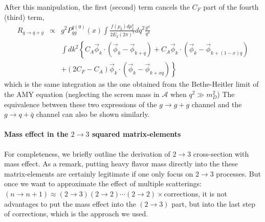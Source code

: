 After this manipulation, the first (second) term cancels the $C_F$ part of the fourth (third) term, 
\begin{eqnarray}
R_{q\rightarrow q+g} &\propto& g^2 P_{qg}^{q(0)}(x) \int  \frac{f(p_2)dp_2^3}{2E_2(2\pi)^3} d q^2 \frac{g^4}{q^4}\\\nonumber
&&  \int d k^2\left\{
C_A\vec{\phi}_{k}\cdot \left( \vec{\phi}_{k}-\vec{\phi}_{k+q} \right)
+C_A\vec{\phi}_{k} \cdot \left( \vec{\phi}_k - \vec{\phi}_{k+(1-x)q}\right) \right.\\\nonumber
&&\left.+(2C_F-C_A)\vec{\phi}_{k} \cdot \left(\vec{\phi}_k-\vec{\phi}_{k+xq} \right)
\right\}
\end{eqnarray}
which is the same integration as the one obtained from the Bethe-Heitler limit of the AMY equation (neglecting the screen mass in $\mathcal{A}$ when $q^2 \gg m_D^2$)
The equivalence between these two expressions of the $g\rightarrow g+g$ channel and the $g\rightarrow q+\bar{q}$ channel can also be shown similarly.

\paragraph*{Mass effect in the $2\rightarrow 3$ squared matrix-elements}
For completeness, we briefly outline the derivation of $2\rightarrow 3$ cross-section with mass effect.
As a remark, putting heavy flavor mass directly into the these matrix-elements are certainly legitimate if one only focus on $2\rightarrow 3$ processes.
But once we want to approximate the effect of multiple scatterings:
$(n \rightarrow n+1) \approx (2 \rightarrow 3)(2 \rightarrow 2)\cdots(2 \rightarrow 2)\times \textrm{corrections}$, it is not advantages to put the mass effect into the $(2 \rightarrow 3)$ part, but into the last step of corrections, which is the approach we used.


